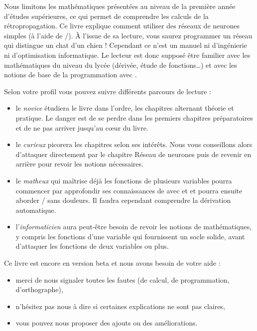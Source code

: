 \medskip

Nous limitons les mathématiques présentées au niveau de la première année d'études supérieures, ce qui permet de comprendre les calculs de la rétropropagation.
Ce livre explique comment utiliser des réseaux de neurones simples (à l'aide de \tensorflow/\keras). À l'issue de sa lecture, vous saurez programmer un réseau qui distingue un chat d'un chien ! Cependant ce n'est un manuel ni d'ingénierie ni d'optimisation informatique. 
Le lecteur est donc supposé être familier avec les mathématiques du niveau du lycée  (dérivée, étude de fonctions\ldots) et avec les notions de base de la programmation avec \Python{}.

\medskip

Selon votre profil vous pouvez suivre différents parcours de lecture :
\begin{itemize}
  \item le \emph{novice} étudiera le livre dans l'ordre, les chapitres alternant théorie et pratique. Le danger est de se perdre dans les premiers chapitres préparatoires et de ne pas arriver jusqu'au c\oe ur du livre.

  \item le \emph{curieux} picorera les chapitres selon ses intérêts. Nous vous conseillons alors d'attaquer directement par le chapitre \og{}Réseau de neurones\fg{} puis de revenir en arrière pour revoir les notions nécessaires.
    
  \item le \emph{matheux} qui maîtrise déjà les fonctions de plusieurs variables pourra commencer par approfondir ses connaissances de \Python{} avec \numpy{} et \matplotlib{} et pourra ensuite aborder \tensorflow/\keras{} sans douleurs. Il faudra cependant comprendre la \og{}dérivation automatique\fg{}.
  
  \item l'\emph{informaticien} aura peut-être besoin de revoir les notions de mathématiques, y compris les fonctions d'une variable qui fournissent un socle solide, avant d'attaquer les fonctions de deux variables ou plus.
\end{itemize}


\bigskip

Ce livre est encore en version \og{}beta\fg{} et nous avons besoin de votre aide :
\begin{itemize}
  \item merci de nous signaler toutes les fautes (de calcul, de programmation, d'orthographe),
  \item n'hésitez pas nous à dire si certaines explications ne sont pas claires,
  \item vous pouvez nous proposer des ajouts ou des améliorations.
\end{itemize}


